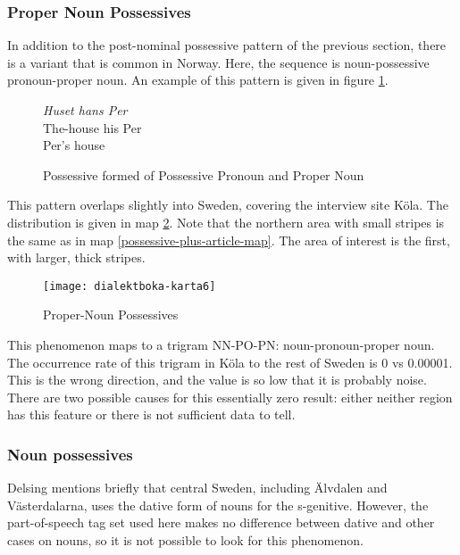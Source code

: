 

\subsubsection{Proper Noun Possessives}

In addition to the post-nominal possessive pattern of the previous
section, there is a variant that is common in Norway. Here, the
sequence is noun-possessive pronoun-proper noun. An example
of this pattern is given in figure \ref{proper-noun-post-possessive}.

\begin{figure}
  {\it Huset hans Per} \\
  The-house his Per \\
  Per's house
  \caption{Possessive formed of Possessive Pronoun and Proper Noun}
  \label{proper-noun-post-possessive}
\end{figure}

This pattern overlaps slightly into Sweden, covering the interview
site K\"ola. The distribution is given in map
\ref{proper-noun-post-possessive-map}. Note that the northern area
with small stripes is the same as in map
\ref{possessive-plus-article-map}. The area of interest is the first,
with larger, thick stripes.

\begin{figure}
  \texttt{[image: dialektboka-karta6]}
  \caption{Proper-Noun Possessives}
  \label{proper-noun-post-possessive-map}
\end{figure}

This phenomenon maps to a trigram NN-PO-PN: noun-pronoun-proper
noun. The occurrence rate of this trigram in K\"ola to the rest of
Sweden is 0 vs 0.00001. This is the wrong direction, and the value is
so low that it is probably noise. There are two possible causes for
this essentially zero result: either neither region has this feature
or there is not sufficient data to tell.

\subsubsection{Noun possessives}

Delsing mentions briefly that central Sweden, including \"Alvdalen and
V\"asterdalarna, uses the dative form of nouns for the
s-genitive. However, the part-of-speech tag set used here makes no
difference between dative and other cases on nouns, so it is not
possible to look for this phenomenon.

